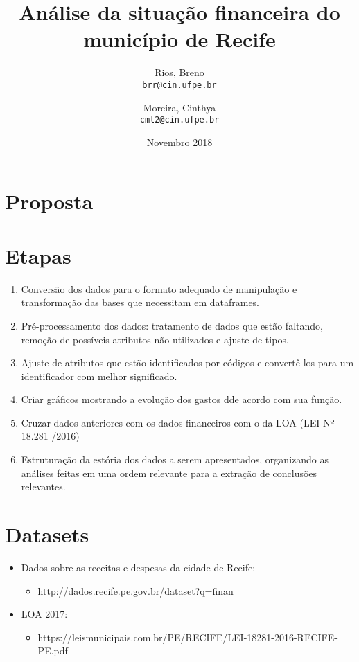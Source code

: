 \documentclass{article}
\title{Análise da situação financeira do município de Recife}
\author{
  Rios, Breno\\
  \texttt{brr@cin.ufpe.br}
  \and
  Moreira, Cinthya\\
  \texttt{cml2@cin.ufpe.br}
}
\date{Novembro 2018}
\begin{document}
\maketitle
\setlength{\parindent}{4em}
\setlength{\parskip}{1em}
\renewcommand{\baselinestretch}{2.0}

\section{Proposta}

\section{Etapas}

 \begin{enumerate}
   \item Conversão dos dados para o formato adequado de manipulação e transformação das bases que necessitam em dataframes.
   \item Pré-processamento dos dados: tratamento de dados que estão faltando, remoção de possíveis atributos não utilizados e ajuste de tipos.
   \item Ajuste de atributos que estão identificados por códigos e convertê-los para um identificador com melhor significado.
   \item Criar gráficos mostrando a evolução dos gastos dde acordo com sua função.
   \item Cruzar dados anteriores com os dados financeiros com o da LOA (LEI Nº 18.281 /2016)
   \item Estruturação da estória dos dados a serem apresentados, organizando as análises feitas em uma ordem relevante para a extração de conclusões relevantes.
 \end{enumerate}

\section{Datasets}
\begin{itemize}
    \item Dados sobre as receitas e despesas da cidade de Recife:
        \begin{itemize}
            \item http://dados.recife.pe.gov.br/dataset?q=finan%
        \end{itemize}

    \item LOA 2017:
        \begin{itemize}
            \item https://leismunicipais.com.br/PE/RECIFE/LEI-18281-2016-RECIFE-PE.pdf
        \end{itemize}  
 \end{itemize}
\end{document}
